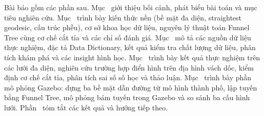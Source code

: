 Bài báo gồm các phần sau. Mục~ giới thiệu bối cảnh, phát biểu bài
toán và mục tiêu nghiên cứu. Mục~ trình bày kiến thức nền (bề mặt
đa diện, straightest geodesic, cấu trúc phễu), cơ sở khoa học dữ liệu, nguyên lý
thuật toán Funnel Tree cùng cơ chế cắt tỉa và các chỉ số đánh giá.
Mục~ mô tả các nguồn dữ liệu thực nghiệm, đặc tả Data Dictionary,
kết quả kiểm tra chất lượng dữ liệu, phân tích khám phá và các insight hình học.
Mục~ trình bày kết quả thực nghiệm trên các lưới đa diện, nghiên
cứu trường hợp điển hình trên địa hình vách dốc, kiểm định cơ chế cắt tỉa, phân
tích sai số số học và thảo luận. Mục~ trình bày phần mô phỏng
Gazebo: dựng ba bề mặt dẫn đường từ mô hình thành phố, lập tuyến bằng Funnel Tree,
mô phỏng bám tuyến trong Gazebo và so sánh ba cấu hình lưới.
Phần~ tóm tắt các kết quả và hướng tiếp theo.

